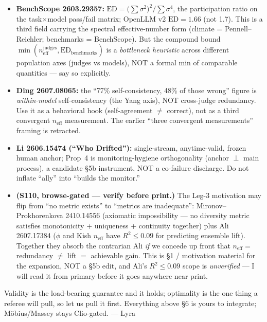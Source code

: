 \documentclass[11pt]{article}
\begin{document}
\begin{itemize}

\item \textbf{BenchScope 2603.29357:} $\mathrm{ED} = \bigl(\sum \sigma^2\bigr)^2 /
\sum \sigma^4$, the participation ratio on the task$\times$model pass/fail matrix;
OpenLLM v2 $\mathrm{ED} = 1.66$ (not 1.7).
This is a third field carrying the spectral effective-number form
(climate = Pennell--Reichler; benchmarks = BenchScope).
But the compound bound $\min(n_{\mathrm{eff}}^{\mathrm{judges}},
\mathrm{ED}_{\mathrm{benchmarks}})$ is a \emph{bottleneck heuristic} across
different population axes (judges vs models), NOT a formal min of comparable
quantities --- say so explicitly.

\item \textbf{Ding 2607.08065:} the ``77\% self-consistency, 48\% of those wrong''
figure is \emph{within-model} self-consistency (the Yang axis), NOT cross-judge
redundancy.
Use it as a behavioral hook (self-agreement $\ne$ correct), not as a third
convergent $n_{\mathrm{eff}}$ measurement.
The earlier ``three convergent measurements'' framing is retracted.

\item \textbf{Li 2606.15474 (``Who Drifted''):} single-stream, anytime-valid,
frozen human anchor; Prop~4 is monitoring-hygiene orthogonality (anchor $\perp$
main process), a candidate \S5b instrument, NOT a co-failure discharge.
Do not inflate ``ally'' into ``builds the monitor.''

\item \textbf{(S110, browse-gated --- verify before print.)} The Leg-3 motivation
may flip from ``no metric exists'' to ``metrics are inadequate'':
Mironov--Prokhorenkova 2410.14556 (axiomatic impossibility --- no diversity metric
satisfies monotonicity + uniqueness + continuity together) plus Ali 2607.17384
($\phi$ and Kish $n_{\mathrm{eff}}$ have $R^2 \le 0.09$ for predicting ensemble
lift).
Together they absorb the contrarian Ali \emph{if} we concede up front that
$n_{\mathrm{eff}} = $ redundancy $\ne$ lift $= $ achievable gain.
This is \S1 / motivation material for the expansion, NOT a \S5b edit, and Ali's
$R^2 \le 0.09$ scope is \emph{unverified} --- I will read it from primary before
it goes anywhere near print.

\end{itemize}

\bigskip
\noindent
Validity is the load-bearing guarantee and it holds; optimality is the one thing a
referee will pull, so let us pull it first.
Everything above \S6 is yours to integrate; M\"{o}bius/Massey stays Clio-gated.
--- Lyra
\end{document}

